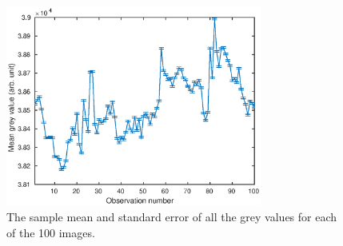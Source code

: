 \documentclass[12pt]{report}
\begin{document}
\begin{figure}[p]
	\centering
	\includegraphics[width=0.75\textwidth]{figures/initial_timeSeries.eps}
	\caption{The sample mean and standard error of all the grey values for each of the 100 images.}
	\label{fig:timeSeries}
\end{figure}
\end{document}
